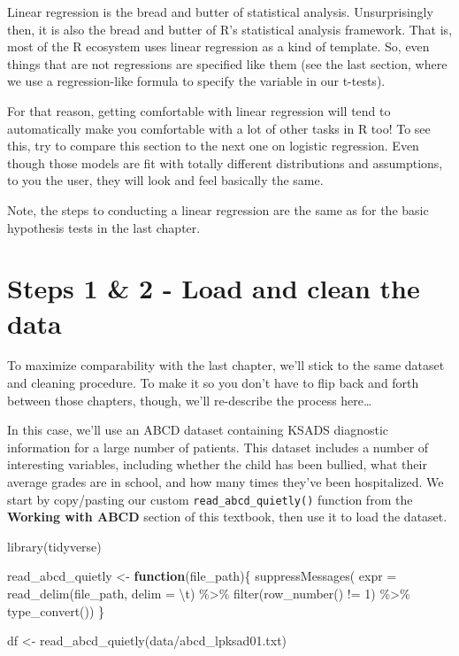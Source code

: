 \documentclass[
]{book}
\newenvironment{Shaded}{\begin{snugshade}}{\end{snugshade}}
\newcommand{\AttributeTok}[1]{\textcolor[rgb]{0.77,0.63,0.00}{#1}}
\newcommand{\ControlFlowTok}[1]{\textcolor[rgb]{0.13,0.29,0.53}{\textbf{#1}}}
\newcommand{\DecValTok}[1]{\textcolor[rgb]{0.00,0.00,0.81}{#1}}
\newcommand{\FunctionTok}[1]{\textcolor[rgb]{0.00,0.00,0.00}{#1}}
\newcommand{\NormalTok}[1]{#1}
\newcommand{\OtherTok}[1]{\textcolor[rgb]{0.56,0.35,0.01}{#1}}
\newcommand{\SpecialCharTok}[1]{\textcolor[rgb]{0.00,0.00,0.00}{#1}}
\newcommand{\StringTok}[1]{\textcolor[rgb]{0.31,0.60,0.02}{#1}}
\begin{document}
Linear regression is the bread and butter of statistical analysis. Unsurprisingly then, it is also the bread and butter of R's statistical analysis framework. That is, most of the R ecosystem uses linear regression as a kind of template. So, even things that are not regressions are specified like them (see the last section, where we use a regression-like formula to specify the variable in our t-tests).

For that reason, getting comfortable with linear regression will tend to automatically make you comfortable with a lot of other tasks in R too! To see this, try to compare this section to the next one on logistic regression. Even though those models are fit with totally different distributions and assumptions, to you the user, they will look and feel basically the same.

Note, the steps to conducting a linear regression are the same as for the basic hypothesis tests in the last chapter.

\hypertarget{steps-1-2---load-and-clean-the-data}{%
\section{Steps 1 \& 2 - Load and clean the data}\label{steps-1-2---load-and-clean-the-data}}

To maximize comparability with the last chapter, we'll stick to the same dataset and cleaning procedure. To make it so you don't have to flip back and forth between those chapters, though, we'll re-describe the process here\ldots{}

In this case, we'll use an ABCD dataset containing KSADS diagnostic information for a large number of patients. This dataset includes a number of interesting variables, including whether the child has been bullied, what their average grades are in school, and how many times they've been hospitalized. We start by copy/pasting our custom \texttt{read\_abcd\_quietly()} function from the \textbf{Working with ABCD} section of this textbook, then use it to load the dataset.

\begin{Shaded}
\begin{Highlighting}[]
\FunctionTok{library}\NormalTok{(tidyverse)}

\NormalTok{read\_abcd\_quietly }\OtherTok{\textless{}{-}} \ControlFlowTok{function}\NormalTok{(file\_path)\{}
  \FunctionTok{suppressMessages}\NormalTok{(}
    \AttributeTok{expr =} \FunctionTok{read\_delim}\NormalTok{(file\_path, }\AttributeTok{delim =} \StringTok{\textquotesingle{}}\SpecialCharTok{\textbackslash{}t}\StringTok{\textquotesingle{}}\NormalTok{) }\SpecialCharTok{\%\textgreater{}\%} 
      \FunctionTok{filter}\NormalTok{(}\FunctionTok{row\_number}\NormalTok{() }\SpecialCharTok{!=} \DecValTok{1}\NormalTok{) }\SpecialCharTok{\%\textgreater{}\%} 
      \FunctionTok{type\_convert}\NormalTok{())}
\NormalTok{\}}

\NormalTok{df }\OtherTok{\textless{}{-}} \FunctionTok{read\_abcd\_quietly}\NormalTok{(}\StringTok{\textquotesingle{}data/abcd\_lpksad01.txt\textquotesingle{}}\NormalTok{)}
\end{Highlighting}
\end{Shaded}
\end{document}
